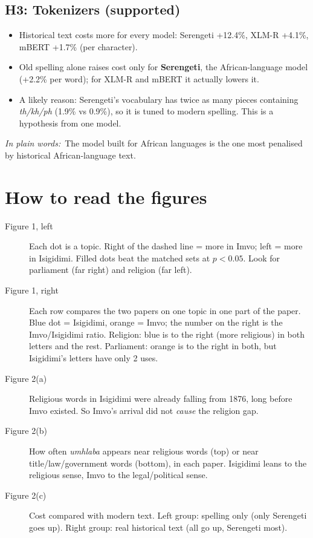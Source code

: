 \documentclass[11pt]{article}
\newcommand{\key}[1]{\textbf{#1}}
\newenvironment{plain}{\par\smallskip\noindent\begin{minipage}{\linewidth}\color{black!75}\small\textit{In plain words:}~}{\end{minipage}\par\smallskip}
\begin{document}
\subsection*{H3: Tokenizers (supported)}
\begin{itemize}
\item Historical text costs more for every model: Serengeti +12.4\%, XLM-R +4.1\%, mBERT +1.7\% (per character).
\item Old spelling alone raises cost only for \key{Serengeti}, the African-language model (+2.2\% per word); for XLM-R and mBERT it actually lowers it.
\item A likely reason: Serengeti's vocabulary has twice as many pieces containing \emph{th/kh/ph} (1.9\% vs 0.9\%), so it is tuned to modern spelling. This is a hypothesis from one model.
\end{itemize}
\begin{plain}The model built for African languages is the one most penalised by historical African-language text.\end{plain}

\section{How to read the figures}
\begin{description}
\item[Figure 1, left] Each dot is a topic. Right of the dashed line = more in Imvo; left = more in Isigidimi. Filled dots beat the matched sets at $p<0.05$. Look for parliament (far right) and religion (far left).
\item[Figure 1, right] Each row compares the two papers on one topic in one part of the paper. Blue dot = Isigidimi, orange = Imvo; the number on the right is the Imvo/Isigidimi ratio. Religion: blue is to the right (more religious) in both letters and the rest. Parliament: orange is to the right in both, but Isigidimi's letters have only 2 uses.
\item[Figure 2(a)] Religious words in Isigidimi were already falling from 1876, long before Imvo existed. So Imvo's arrival did not \emph{cause} the religion gap.
\item[Figure 2(b)] How often \emph{umhlaba} appears near religious words (top) or near title/law/government words (bottom), in each paper. Isigidimi leans to the religious sense, Imvo to the legal/political sense.
\item[Figure 2(c)] Cost compared with modern text. Left group: spelling only (only Serengeti goes up). Right group: real historical text (all go up, Serengeti most).
\end{description}
\end{document}
